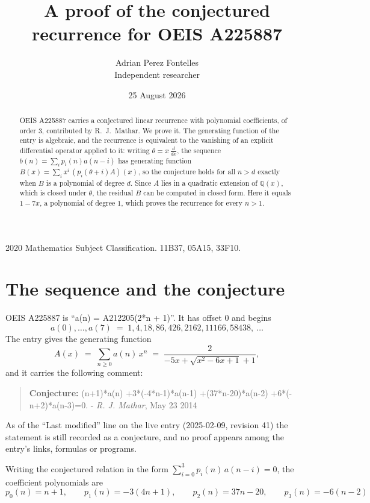 \documentclass[11pt,a4paper]{article}
\title{A proof of the conjectured recurrence for OEIS A225887}
\author{Adrian Perez Fontelles\\ \small Independent researcher}
\date{25 August 2026}
\theoremstyle{plain}
\theoremstyle{definition}
\begin{document}
\maketitle

\begin{abstract}
OEIS A225887 carries a conjectured linear recurrence with polynomial coefficients, of
order 3, contributed by R.~J.~Mathar. We prove it. The generating function of the
entry is algebraic, and the recurrence is equivalent to the vanishing of an explicit
differential operator applied to it: writing $\theta=x\,\frac{d}{dx}$, the sequence
$b(n)=\sum_{i}p_{i}(n)a(n-i)$ has generating function
$B(x)=\sum_{i}x^{i}\,(p_{i}(\theta+i)A)(x)$, so the conjecture holds for all $n>d$ exactly
when $B$ is a polynomial of degree $d$. Since $A$ lies in a quadratic extension of
$\mathbb{Q}(x)$, which is closed under $\theta$, the residual $B$ can be computed in
closed form. Here it equals $1 - 7 x$, a polynomial of degree $1$, which proves
the recurrence for every $n>1$.
\end{abstract}

\noindent\small 2020 Mathematics Subject Classification. 11B37, 05A15, 33F10.\normalsize

\section{The sequence and the conjecture}

OEIS A225887 is ``a(n) = A212205(2*n + 1)''. It has offset $0$ and begins
\[
a(0),\dots,a(7)\;=\;1, 4, 18, 86, 426, 2162, 11166, 58438,\ \dots
\]
The entry gives the generating function
\begin{equation}\label{eq:gf}
A(x)\;=\;\sum_{n\ge 0} a(n)\,x^{n}\;=\;\frac{2}{- 5 x + \sqrt{x^{2} - 6 x + 1} + 1} ,
\end{equation}
and it carries the following comment:
\begin{quote}\small
\textbf{Conjecture:} (n+1)*a(n) +3*(-4*n-1)*a(n-1) +(37*n-20)*a(n-2) +6*(-n+2)*a(n-3)=0. - \emph{R. J. Mathar}, May 23 2014
\end{quote}
As of the ``Last modified'' line on the live entry (2025-02-09, revision 41) the
statement is still recorded as a conjecture, and no proof appears among the entry's links,
formulas or programs.

Writing the conjectured relation in the form $\sum_{i=0}^{3}p_{i}(n)\,a(n-i)=0$,
the coefficient polynomials are
\[
p_{0}(n)=n + 1,\qquad p_{1}(n)=- 3 \left(4 n + 1\right),\qquad p_{2}(n)=37 n - 20,\qquad p_{3}(n)=- 6 \left(n - 2\right)
\]
\end{document}
